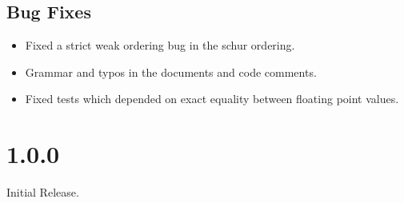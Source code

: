 \subsection{Bug Fixes}
\begin{itemize}
\item Fixed a strict weak ordering bug in the schur ordering.
\item Grammar and typos in the documents and code comments.
\item Fixed tests which depended on exact equality between floating point values.
\end{itemize}
\section*{1.0.0}
Initial Release.
